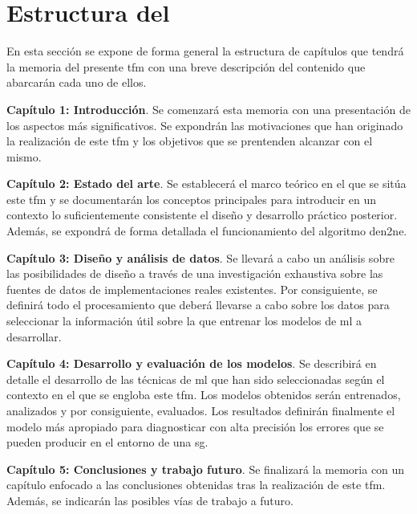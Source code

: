 \section{Estructura del }
\label{sec:structure}

En esta sección se expone de forma general la estructura de capítulos que tendrá la memoria del presente \gls{tfm} con una breve descripción del contenido que abarcarán cada uno de ellos.

\begin{description}
    \item\textbf{Capítulo 1: Introducción}. Se comenzará esta memoria con una presentación de los aspectos más significativos. Se expondrán las motivaciones que han originado la realización de este \gls{tfm} y los objetivos que se prentenden alcanzar con el mismo.

    \item\textbf{Capítulo 2: Estado del arte}. Se establecerá el marco teórico en el que se sitúa este \gls{tfm} y se documentarán los conceptos principales para introducir en un contexto lo suficientemente consistente el diseño y desarrollo práctico posterior. Además, se expondrá de forma detallada el funcionamiento del algoritmo \gls{den2ne}.

    \item\textbf{Capítulo 3: Diseño y análisis de datos}. Se llevará a cabo un análisis sobre las posibilidades de diseño a través de una investigación exhaustiva sobre las fuentes de datos de implementaciones reales existentes. Por consiguiente, se definirá todo el procesamiento que deberá llevarse a cabo sobre los datos para seleccionar la información útil sobre la que entrenar los modelos de \gls{ml} a desarrollar. 

    \item\textbf{Capítulo 4: Desarrollo y evaluación de los modelos}. Se describirá en detalle el desarrollo de las técnicas de \gls{ml} que han sido seleccionadas según el contexto en el que se engloba este \gls{tfm}. Los modelos obtenidos serán entrenados, analizados y por consiguiente, evaluados. Los resultados definirán finalmente el modelo más apropiado para diagnosticar con alta precisión los errores que se pueden producir en el entorno de una \gls{sg}.
    
    \item\textbf{Capítulo 5: Conclusiones y trabajo futuro}. Se finalizará la memoria con un capítulo enfocado a las conclusiones obtenidas tras la realización de este \gls{tfm}. Además, se indicarán las posibles vías de trabajo a futuro.


\end{description}
